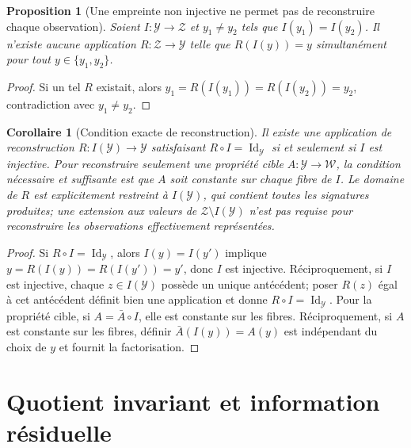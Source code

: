 \documentclass[11pt,oneside]{book}
\newtheorem{proposition}[theoreme]{Proposition}
\newtheorem{corollaire}[theoreme]{Corollaire}
\theoremstyle{definition}
\theoremstyle{remark}
\newcommand{\Y}{\mathcal Y}
\newcommand{\Z}{\mathcal Z}
\newcommand{\W}{\mathcal W}
\newcommand{\1}{\mathbf 1}
\newcommand{\Id}{\operatorname{Id}}
\begin{document}
\begin{proposition}[Une empreinte non injective ne permet pas de reconstruire chaque observation]
Soient \(I:\Y\to\Z\) et \(y_1\ne y_2\) tels que \(I(y_1)=I(y_2)\). Il n'existe aucune application \(R:\Z\to\Y\) telle que \(R(I(y))=y\) simultanément pour tout \(y\in\{y_1,y_2\}\).
\end{proposition}
\begin{proof}
Si un tel \(R\) existait, alors \(y_1=R(I(y_1))=R(I(y_2))=y_2\), contradiction avec \(y_1\ne y_2\).\end{proof}
\begin{corollaire}[Condition exacte de reconstruction]
Il existe une application de reconstruction $R:I(\Y)\to\Y$ satisfaisant $R\circ I=\Id_\Y$ si et seulement si $I$ est injective. Pour reconstruire seulement une propriété cible $A:\Y\to\W$, la condition nécessaire et suffisante est que $A$ soit constante sur chaque fibre de $I$. Le domaine de $R$ est explicitement restreint à $I(\Y)$, qui contient toutes les signatures produites; une extension aux valeurs de $\Z\setminus I(\Y)$ n'est pas requise pour reconstruire les observations effectivement représentées.
\end{corollaire}
\begin{proof}
Si $R\circ I=\Id_\Y$, alors $I(y)=I(y')$ implique $y=R(I(y))=R(I(y'))=y'$, donc $I$ est injective. Réciproquement, si $I$ est injective, chaque $z\in I(\Y)$ possède un unique antécédent; poser $R(z)$ égal à cet antécédent définit bien une application et donne $R\circ I=\Id_\Y$. Pour la propriété cible, si $A=\bar A\circ I$, elle est constante sur les fibres. Réciproquement, si $A$ est constante sur les fibres, définir $\bar A(I(y))=A(y)$ est indépendant du choix de $y$ et fournit la factorisation.\end{proof}

\chapter{Quotient invariant et information résiduelle}
\end{document}
